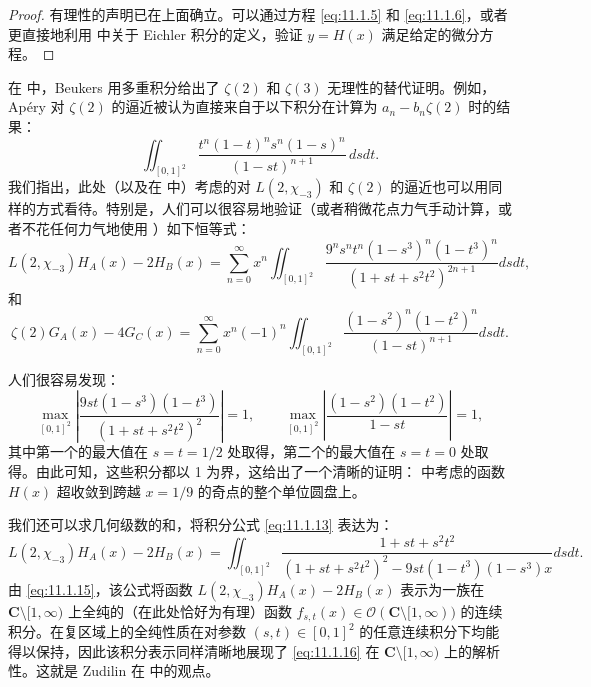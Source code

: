 \begin{proof}
有理性的声明已在上面确立。可以通过方程 \eqref{eq:11.1.5} 和 \eqref{eq:11.1.6}，或者更直接地利用 \cite{Beu87} 中关于 Eichler 积分的定义，验证 $y = H(x)$ 满足给定的微分方程。
\end{proof}

\begin{remark}\label{rem:11.1.11}
在 \cite{Beu79} 中，Beukers 用多重积分给出了 $\zeta(2)$ 和 $\zeta(3)$ 无理性的替代证明。例如，Ap{\'e}ry 对 $\zeta(2)$ 的逼近被认为直接来自于以下积分在计算为 $a_n - b_n \zeta(2)$ 时的结果：
\begin{equation}\label{eq:11.1.12}
\iint_{[0,1]^2} \frac{t^n (1-t)^n s^n (1-s)^n}{(1-st)^{n+1}} \, ds dt.
\end{equation}
我们指出，此处（以及在 \cite{Zag09} 中）考虑的对 $L(2, \chi_{-3})$ 和 $\zeta(2)$ 的逼近也可以用同样的方式看待。特别是，人们可以很容易地验证（或者稍微花点力气手动计算，或者不花任何力气地使用 \cite{AZ90}）如下恒等式：
\begin{equation}\label{eq:11.1.13}
L(2,\chi_{-3})H_A(x) - 2H_B(x) = \sum_{n=0}^{\infty} x^n \iint_{[0,1]^2} \frac{9^n s^n t^n (1-s^3)^n (1-t^3)^n}{(1+st+s^2t^2)^{2n+1}} ds dt,
\end{equation}
和
\begin{equation}\label{eq:11.1.14}
\zeta(2)G_A(x) - 4G_C(x) = \sum_{n=0}^{\infty} x^n (-1)^n \iint_{[0,1]^2} \frac{(1-s^2)^n (1-t^2)^n}{(1-st)^{n+1}} ds dt.
\end{equation}
\end{remark}

人们很容易发现：
\begin{equation}\label{eq:11.1.15}
\max_{[0,1]^2} \left| \frac{9st(1-s^3)(1-t^3)}{(1+st+s^2t^2)^2} \right| = 1, \qquad \max_{[0,1]^2} \left| \frac{(1-s^2)(1-t^2)}{1-st} \right| = 1,
\end{equation}
其中第一个的最大值在 $s = t = 1/2$ 处取得，第二个的最大值在 $s = t = 0$ 处取得。由此可知，这些积分都以 1 为界，这给出了一个清晰的证明： 中考虑的函数 $H(x)$ 超收敛到跨越 $x = 1/9$ 的奇点的整个单位圆盘上。

我们还可以求几何级数的和，将积分公式 \eqref{eq:11.1.13} 表达为：
\begin{equation}\label{eq:11.1.16}
L(2,\chi_{-3})H_A(x) - 2H_B(x) = \iint_{[0,1]^2} \frac{1 + st + s^2t^2}{(1 + st + s^2t^2)^2 - 9st(1 - t^3)(1 - s^3)x} dsdt.
\end{equation}
由 \eqref{eq:11.1.15}，该公式将函数 $L(2,\chi_{-3})H_A(x) - 2H_B(x)$ 表示为一族在 $\mathbf{C} \setminus [1,\infty)$ 上全纯的（在此处恰好为有理）函数 $f_{s,t}(x) \in \mathcal{O}(\mathbf{C} \setminus [1,\infty))$ 的连续积分。在复区域上的全纯性质在对参数 $(s,t) \in [0,1]^2$ 的任意连续积分下均能得以保持，因此该积分表示同样清晰地展现了 \eqref{eq:11.1.16} 在 $\mathbf{C} \setminus [1,\infty)$ 上的解析性。这就是 Zudilin 在 \cite{Zud17} 中的观点。

